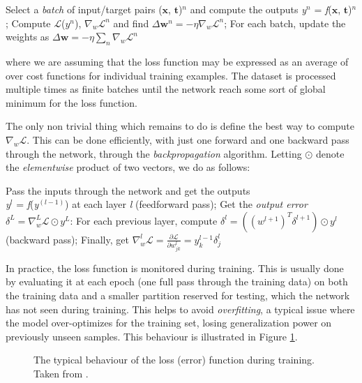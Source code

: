 \begin{outline}[enumerate]
    \1 Select a \emph{batch} of input/target pairs ($\mathbf{x}$, $\mathbf{t}$)$^n$ and compute the outputs \emph{y}$^n$ = \emph{f}($\mathbf{x}$, $\mathbf{t}$)$^n$;
    \1 Compute $\mathcal{L}$($y^n$), $\nabla_w \mathcal{L}^n$ and find $ \Delta \mathbf{w}^n = - \eta \nabla_w \mathcal{L}^n$;
    \1 For each batch, update the weights as $ \Delta \mathbf{w} = - \eta \sum_n \nabla_w \mathcal{L}^n$
\end{outline}

where we are assuming that the loss function may be expressed as an average of over cost functions for individual training examples. The dataset is processed multiple times as finite batches until the network reach some sort of global minimum for the loss function.

The only non trivial thing which remains to do is define the best way to compute $\nabla_w \mathcal{L}$. This can be done efficiently, with just one forward and one backward pass through the network, through the \emph{backpropagation} algorithm. Letting $\odot$ denote the \emph{elementwise} product of two vectors, we do as follows:

\begin{outline}[enumerate]
    \1 Pass the inputs through the network and get the outputs\\
    \emph{y}$^l$ = \emph{f}(\emph{y}$^{(l-1)}$) at each layer \emph{l} (feedforward pass);
    \1 Get the \emph{output error} $\delta^L = \nabla_w^L \mathcal{L} \odot y^L$:
    \1 For each previous layer, compute $\delta^l = ((w^{l+1})^T\delta^{l+1})\odot y^l$ (backward pass);
    \1 Finally, get $\nabla_w^l \mathcal{L} = \frac{\partial \mathcal{L}}{\partial w^l_{jk}} = y^{l-1}_k\delta^l_j$
\end{outline}


In practice, the loss function is monitored during training. This is usually done by evaluating it at each epoch (one full pass through the training data) on both the training data and a smaller partition reserved for testing, which the network has not seen during training. This helps to avoid \emph{overfitting}, a typical issue where the model over-optimizes for the training set, losing generalization power on previously unseen samples. This behaviour is illustrated in Figure \ref{fig:overf}.

\begin{figure}
    \centering
    
    \caption[Overfitting]{The typical behaviour of the loss (error) function during training.
    Taken from \cite{overfig}.}
    \label{fig:overf}
\end{figure}

